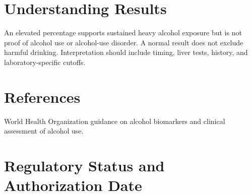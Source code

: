 \section*{Understanding Results}
An elevated percentage supports sustained heavy alcohol exposure but is not proof of alcohol use or alcohol-use disorder. A normal result does not exclude harmful drinking. Interpretation should include timing, liver tests, history, and laboratory-specific cutoffs.

\section*{References}
World Health Organization guidance on alcohol biomarkers and clinical assessment of alcohol use.

\clearpage


\section*{Regulatory Status and Authorization Date}

\clearpage
